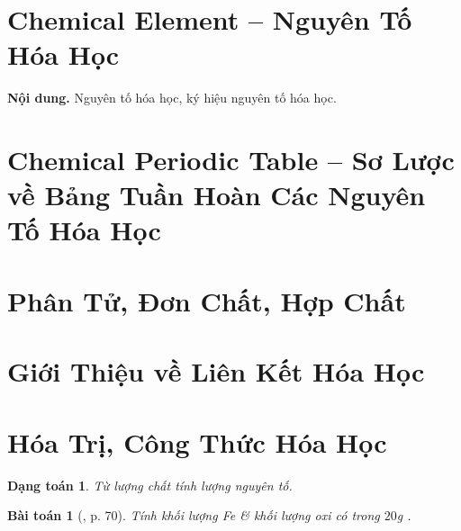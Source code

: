 \documentclass{article}
\newtheorem{baitoan}{Bài toán}
\newtheorem{dangtoan}{Dạng toán}
\begin{document}

\section{Chemical Element -- Nguyên Tố Hóa Học}
\textsf{\textbf{Nội dung.} Nguyên tố hóa học, ký hiệu nguyên tố hóa học.}


\section{Chemical Periodic Table -- Sơ Lược về Bảng Tuần Hoàn Các Nguyên Tố Hóa Học}


\section{Phân Tử, Đơn Chất, Hợp Chất}


\section{Giới Thiệu về Liên Kết Hóa Học}


\section{Hóa Trị, Công Thức Hóa Học}

\begin{dangtoan}
	Từ lượng chất tính lượng nguyên tố.
\end{dangtoan}

\begin{baitoan}[\cite{Tuan2022}, p. 70]
	Tính khối lượng \emph{Fe} \& khối lượng oxi có trong $20$\emph{g} \emph{}.
\end{baitoan}
\end{document}

